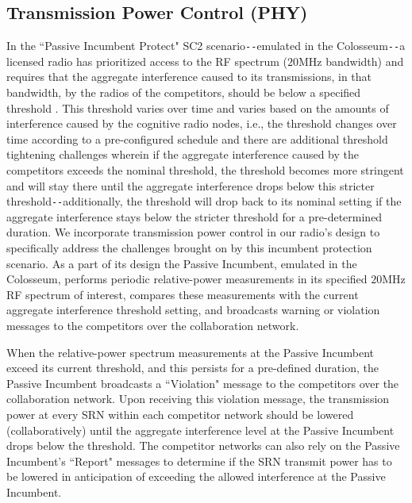 \subsection{Transmission Power Control (PHY)}\label{B.I.I}
In the ``Passive Incumbent Protect" SC2 scenario\texttt{-{}-}emulated in the Colosseum\texttt{-{}-}a licensed radio has prioritized access to the RF spectrum ($20$MHz bandwidth) and requires that the aggregate interference caused to its transmissions, in that bandwidth, by the radios of the competitors, should be below a specified threshold \cite{DARPA:SC2pi}. This threshold varies over time and varies based on the amounts of interference caused by the cognitive radio nodes, i.e., the threshold changes over time according to a pre-configured schedule and there are additional threshold tightening challenges wherein if the aggregate interference caused by the competitors exceeds the nominal threshold, the threshold becomes more stringent and will stay there until the aggregate interference drops below this stricter threshold\texttt{-{}-}additionally, the threshold will drop back to its nominal setting if the aggregate interference stays below the stricter threshold for a pre-determined duration. We incorporate transmission power control in our radio's design to specifically address the challenges brought on by this incumbent protection scenario. As a part of its design the Passive Incumbent, emulated in the Colosseum, performs periodic relative-power measurements in its specified $20$MHz RF spectrum of interest, compares these measurements with the current aggregate interference threshold setting, and broadcasts warning or violation messages to the competitors over the collaboration network.

When the relative-power spectrum measurements at the Passive Incumbent exceed its current threshold, and this persists for a pre-defined duration, the Passive Incumbent broadcasts a ``Violation" message to the competitors over the collaboration network. Upon receiving this violation message, the transmission power at every SRN within each competitor network should be lowered (collaboratively) until the aggregate interference level at the Passive Incumbent drops below the threshold. The competitor networks can also rely on the Passive Incumbent's ``Report" messages to determine if the SRN transmit power has to be lowered in anticipation of exceeding the allowed interference at the Passive Incumbent.

